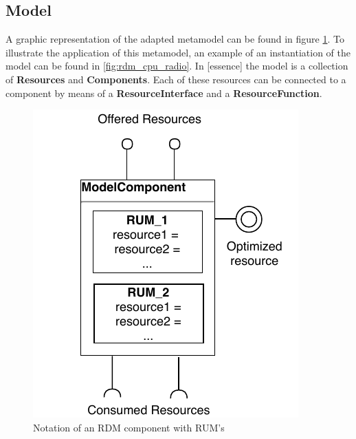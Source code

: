 \subsection{Model}
A graphic representation of the adapted metamodel can be found in figure \ref{fig:component}. To illustrate the application of this metamodel, an example of an instantiation of the model can be found in \ref{fig:rdm_cpu_radio}. In [essence] the model is a collection of \textbf{Resources} and \textbf{Components}. Each of these resources can be connected to a component by means of a \textbf{ResourceInterface} and a \textbf{ResourceFunction}. 
\begin{figure}
\centering
  \includegraphics[width=0.5\linewidth]{resources/img/component.pdf}
  \caption{Notation of an RDM component with RUM's}
  \label{fig:component}
\end{figure}
